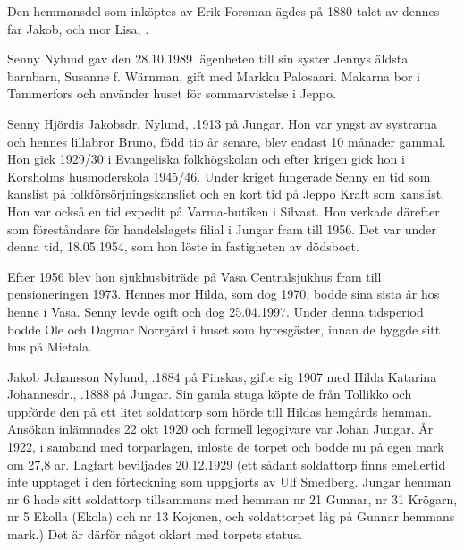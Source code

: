 Den hemmansdel som inköptes av Erik Forsman ägdes på 1880-talet av dennes far Jakob,  och mor Lisa, .





Senny Nylund gav den 28.10.1989 lägenheten till sin syster Jennys äldsta barnbarn, Susanne f. Wärnman, gift med Markku Palosaari. Makarna bor i Tammerfors och använder huset för sommarvistelse i Jeppo.\jhvspace{}



Senny Hjördis Jakobsdr. Nylund, .1913 på Jungar. Hon var yngst av systrarna och hennes lillabror Bruno, född tio år senare, blev endast 10 månader gammal. Hon gick 1929/30 i Evangeliska folkhögskolan och efter krigen gick hon i Korsholms husmoderskola 1945/46. Under kriget fungerade Senny en tid som kanslist på folkförsörjningskansliet och en kort tid på Jeppo Kraft som kanslist. Hon var också en tid expedit på Varma-butiken i Silvast. Hon verkade därefter som föreståndare för handelslagets filial i Jungar fram till 1956.  Det var under denna tid, 18.05.1954, som hon löste  in fastigheten av dödsboet.

Efter 1956 blev hon sjukhusbiträde på Vasa Centralsjukhus fram till pensioneringen 1973. Hennes mor Hilda, som dog 1970, bodde sina sista år hos henne i Vasa. Senny levde ogift och  dog  25.04.1997. Under denna tidsperiod bodde Ole och Dagmar Norrgård i huset som hyresgäster, innan de byggde sitt hus på Mietala.


Jakob Johansson Nylund, .1884 på Finskas, gifte sig 1907 med Hilda Katarina Johannesdr., .1888 på Jungar. Sin gamla stuga köpte de från Tollikko och uppförde den på ett litet soldattorp som hörde till Hildas hemgårds hemman. Ansökan inlämnades 22 okt 1920 och formell legogivare var Johan Jungar. År 1922, i samband med torparlagen, inlöste de torpet och bodde nu på egen mark om 27,8 ar. Lagfart beviljades 20.12.1929 (ett sådant soldattorp finns emellertid inte upptaget i den förteckning som uppgjorts av Ulf Smedberg. Jungar hemman nr 6 hade sitt soldattorp tillsammans med hemman nr 21 Gunnar, nr 31 Krögarn, nr 5 Ekolla (Ekola) och nr 13 Kojonen, och soldattorpet  låg på Gunnar hemmans mark.) Det är därför något oklart med torpets status.


